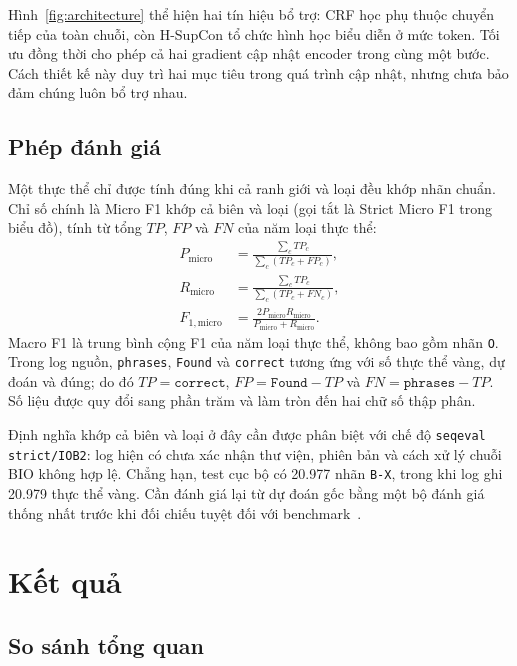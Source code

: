 \documentclass[conference,a4paper]{IEEEtran}
\begin{document}
Hình~\ref{fig:architecture} thể hiện hai tín hiệu bổ trợ: CRF học phụ
thuộc chuyển tiếp của toàn chuỗi, còn H-SupCon tổ chức hình học biểu
diễn ở mức token. Tối ưu đồng thời cho phép cả hai gradient cập nhật
encoder trong cùng một bước. Cách thiết kế này duy trì hai mục tiêu
trong quá trình cập nhật, nhưng chưa bảo đảm chúng luôn bổ trợ nhau.

\subsection{Phép đánh giá}\label{subsec:evaluation}

Một thực thể chỉ được tính đúng khi cả ranh giới và loại đều khớp nhãn
chuẩn. Chỉ số chính là Micro F1 khớp cả biên và loại (gọi tắt là Strict
Micro F1 trong biểu đồ), tính từ tổng $TP$, $FP$ và $FN$
của năm loại thực thể:
\begin{align}
P_{\mathrm{micro}}
 &= \frac{\sum_c TP_c}{\sum_c(TP_c+FP_c)},\\
R_{\mathrm{micro}}
 &= \frac{\sum_c TP_c}{\sum_c(TP_c+FN_c)},\\
F_{1,\mathrm{micro}}
 &= \frac{2P_{\mathrm{micro}}R_{\mathrm{micro}}}
 {P_{\mathrm{micro}}+R_{\mathrm{micro}}}.
\end{align}
Macro F1 là trung bình cộng F1 của năm loại thực thể, không bao gồm
nhãn \texttt{O}. Trong log nguồn, \texttt{phrases}, \texttt{Found} và
\texttt{correct} tương ứng với số thực thể vàng, dự đoán và đúng;
do đó $TP=\texttt{correct}$, $FP=\texttt{Found}-TP$ và
$FN=\texttt{phrases}-TP$. Số liệu được quy đổi sang phần trăm và làm
tròn đến hai chữ số thập phân.

Định nghĩa khớp cả biên và loại ở đây cần được phân biệt với chế độ
\texttt{seqeval strict/IOB2}: log hiện có chưa xác nhận thư viện, phiên
bản và cách xử lý chuỗi BIO không hợp lệ. Chẳng hạn, test cục bộ có
20.977 nhãn \texttt{B-X}, trong khi log ghi 20.979 thực thể vàng.
Cần đánh giá lại từ dự đoán gốc bằng một bộ đánh giá thống nhất trước
khi đối chiếu tuyệt đối với benchmark~\cite{nakayama2018seqeval}.

\section{Kết quả}\label{sec:results}

\subsection{So sánh tổng quan}\label{subsec:overall}
\end{document}
